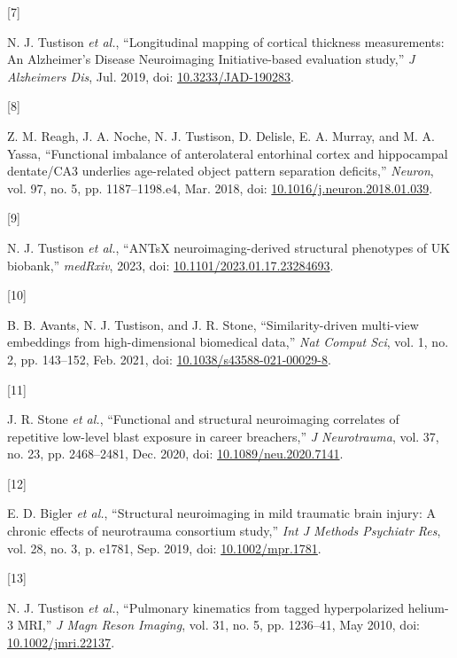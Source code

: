 \documentclass[
  11pt,
]{article}
\newlength{\cslhangindent}
\newlength{\csllabelwidth}
\newenvironment{CSLReferences}[2] %
 {%
  \setlength{\parindent}{0pt}
  \ifodd #1 \everypar{\setlength{\hangindent}{\cslhangindent}}\ignorespaces\fi
  \ifnum #2 > 0
  \setlength{\parskip}{#2\baselineskip}
  \fi
 }%
 {}
\newcommand{\CSLLeftMargin}[1]{\parbox[t]{\csllabelwidth}{#1}}
\newcommand{\CSLRightInline}[1]{\parbox[t]{\linewidth - \csllabelwidth}{#1}\break}
\begin{document}
\begin{CSLReferences}{0}{0}
\leavevmode{}%
\CSLLeftMargin{{[}7{]} }
\CSLRightInline{N. J. Tustison \emph{et al.}, {``Longitudinal mapping of
cortical thickness measurements: An {A}lzheimer's {D}isease
{N}euroimaging {I}nitiative-based evaluation study,''} \emph{J
Alzheimers Dis}, Jul. 2019, doi:
\href{https://doi.org/10.3233/JAD-190283}{10.3233/JAD-190283}.}

\leavevmode{}%
\CSLLeftMargin{{[}8{]} }
\CSLRightInline{Z. M. Reagh, J. A. Noche, N. J. Tustison, D. Delisle, E.
A. Murray, and M. A. Yassa, {``Functional imbalance of anterolateral
entorhinal cortex and hippocampal dentate/CA3 underlies age-related
object pattern separation deficits,''} \emph{Neuron}, vol. 97, no. 5,
pp. 1187--1198.e4, Mar. 2018, doi:
\href{https://doi.org/10.1016/j.neuron.2018.01.039}{10.1016/j.neuron.2018.01.039}.}

\leavevmode{}%
\CSLLeftMargin{{[}9{]} }
\CSLRightInline{N. J. Tustison \emph{et al.}, {``ANTsX
neuroimaging-derived structural phenotypes of UK biobank,''}
\emph{medRxiv}, 2023, doi:
\href{https://doi.org/10.1101/2023.01.17.23284693}{10.1101/2023.01.17.23284693}.}

\leavevmode{}%
\CSLLeftMargin{{[}10{]} }
\CSLRightInline{B. B. Avants, N. J. Tustison, and J. R. Stone,
{``Similarity-driven multi-view embeddings from high-dimensional
biomedical data,''} \emph{Nat Comput Sci}, vol. 1, no. 2, pp. 143--152,
Feb. 2021, doi:
\href{https://doi.org/10.1038/s43588-021-00029-8}{10.1038/s43588-021-00029-8}.}

\leavevmode{}%
\CSLLeftMargin{{[}11{]} }
\CSLRightInline{J. R. Stone \emph{et al.}, {``Functional and structural
neuroimaging correlates of repetitive low-level blast exposure in career
breachers,''} \emph{J Neurotrauma}, vol. 37, no. 23, pp. 2468--2481,
Dec. 2020, doi:
\href{https://doi.org/10.1089/neu.2020.7141}{10.1089/neu.2020.7141}.}

\leavevmode{}%
\CSLLeftMargin{{[}12{]} }
\CSLRightInline{E. D. Bigler \emph{et al.}, {``Structural neuroimaging
in mild traumatic brain injury: A chronic effects of neurotrauma
consortium study,''} \emph{Int J Methods Psychiatr Res}, vol. 28, no. 3,
p. e1781, Sep. 2019, doi:
\href{https://doi.org/10.1002/mpr.1781}{10.1002/mpr.1781}.}

\leavevmode{}%
\CSLLeftMargin{{[}13{]} }
\CSLRightInline{N. J. Tustison \emph{et al.}, {``Pulmonary kinematics
from tagged hyperpolarized helium-3 MRI,''} \emph{J Magn Reson Imaging},
vol. 31, no. 5, pp. 1236--41, May 2010, doi:
\href{https://doi.org/10.1002/jmri.22137}{10.1002/jmri.22137}.}


\end{CSLReferences}
\end{document}
